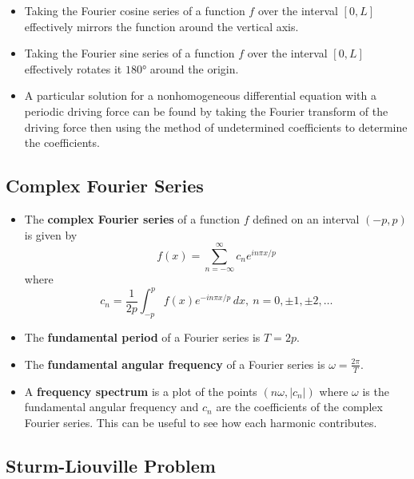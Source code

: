 \documentclass{article}
\begin{document}
\begin{itemize}
  \item Taking the Fourier cosine series of a function $f$ over the interval $[0, L]$ effectively mirrors the function around the vertical axis.

  \item Taking the Fourier sine series of a function $f$ over the interval $[0, L]$ effectively rotates it $\ang{180}$ around the origin.

  \item A particular solution for a nonhomogeneous differential equation with a periodic driving force can be found by taking the Fourier transform of the driving force then using the method of undetermined coefficients to determine the coefficients.
\end{itemize}

\subsection{Complex Fourier Series}

\begin{itemize}
  \item The \textbf{complex Fourier series} of a function $f$ defined on an interval $(-p, p)$ is given by \[f(x) = \sum_{n = -\infty}^\infty c_n e^{i n \pi x / p}\] where \[c_n = \frac{1}{2 p} \int_{-p}^p f(x) e^{-i n \pi x / p} \,d x,\ n = 0, \pm 1, \pm 2, \ldots\]

  \item The \textbf{fundamental period} of a Fourier series is $T = 2 p$.

  \item The \textbf{fundamental angular frequency} of a Fourier series is $\omega = \frac{2 \pi}{T}$.

  \item A \textbf{frequency spectrum} is a plot of the points $(n \omega, |c_n|)$ where $\omega$ is the fundamental angular frequency and $c_n$ are the coefficients of the complex Fourier series. This can be useful to see how each harmonic contributes.
\end{itemize}

\subsection{Sturm-Liouville Problem}
\end{document}
